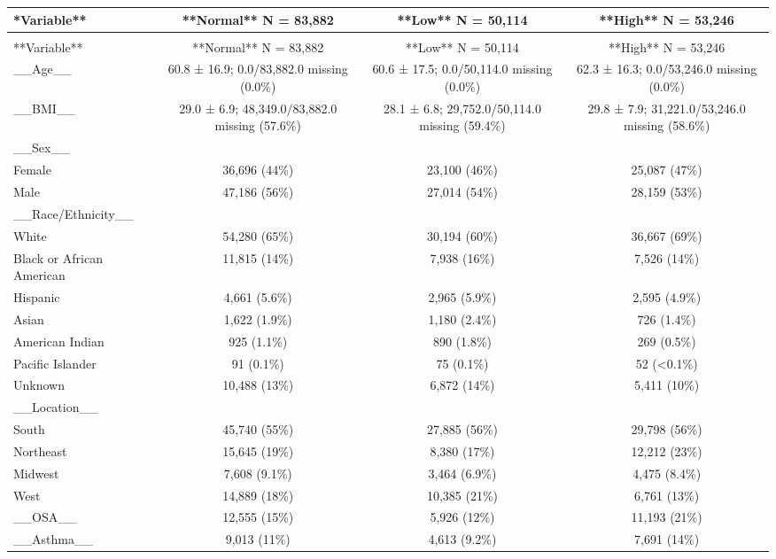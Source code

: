 \documentclass[
  11pt,
  letterpaper,
  DIV=11,
  numbers=noendperiod]{scrartcl}
\begin{document}
\begin{longtable*}{>{\raggedright\arraybackslash}p{2.0in}ccc}
\toprule
**Variable** & **Normal**  N = 83,882 & **Low**  N = 50,114 & **High**  N = 53,246\\
\midrule
\endfirsthead
{}\\
\toprule
**Variable** & **Normal**  N = 83,882 & **Low**  N = 50,114 & **High**  N = 53,246\\
\midrule
\endhead

\endfoot
\bottomrule
\endlastfoot
\_\_Age\_\_ & 60.8 ± 16.9; 0.0/83,882.0 missing (0.0\%) & 60.6 ± 17.5; 0.0/50,114.0 missing (0.0\%) & 62.3 ± 16.3; 0.0/53,246.0 missing (0.0\%)\\
\_\_BMI\_\_ & 29.0 ± 6.9; 48,349.0/83,882.0 missing (57.6\%) & 28.1 ± 6.8; 29,752.0/50,114.0 missing (59.4\%) & 29.8 ± 7.9; 31,221.0/53,246.0 missing (58.6\%)\\
\_\_Sex\_\_ &  &  & \\
Female & 36,696 (44\%) & 23,100 (46\%) & 25,087 (47\%)\\
Male & 47,186 (56\%) & 27,014 (54\%) & 28,159 (53\%)\\
\addlinespace
\_\_Race/Ethnicity\_\_ &  &  & \\
White & 54,280 (65\%) & 30,194 (60\%) & 36,667 (69\%)\\
Black or African American & 11,815 (14\%) & 7,938 (16\%) & 7,526 (14\%)\\
Hispanic & 4,661 (5.6\%) & 2,965 (5.9\%) & 2,595 (4.9\%)\\
Asian & 1,622 (1.9\%) & 1,180 (2.4\%) & 726 (1.4\%)\\
\addlinespace
American Indian & 925 (1.1\%) & 890 (1.8\%) & 269 (0.5\%)\\
Pacific Islander & 91 (0.1\%) & 75 (0.1\%) & 52 (<0.1\%)\\
Unknown & 10,488 (13\%) & 6,872 (14\%) & 5,411 (10\%)\\
\_\_Location\_\_ &  &  & \\
South & 45,740 (55\%) & 27,885 (56\%) & 29,798 (56\%)\\
\addlinespace
Northeast & 15,645 (19\%) & 8,380 (17\%) & 12,212 (23\%)\\
Midwest & 7,608 (9.1\%) & 3,464 (6.9\%) & 4,475 (8.4\%)\\
West & 14,889 (18\%) & 10,385 (21\%) & 6,761 (13\%)\\
\_\_OSA\_\_ & 12,555 (15\%) & 5,926 (12\%) & 11,193 (21\%)\\
\_\_Asthma\_\_ & 9,013 (11\%) & 4,613 (9.2\%) & 7,691 (14\%)\\

\end{longtable*}
\end{document}
